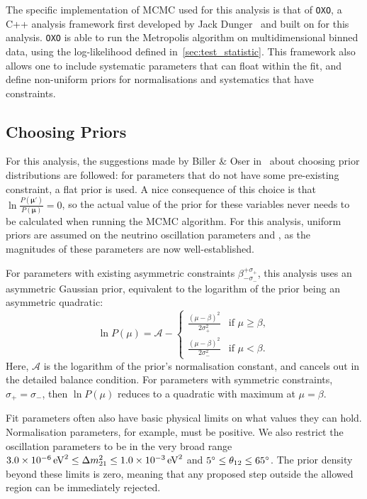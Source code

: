 The specific implementation of MCMC used for this analysis is that of \texttt{OXO}, a C++ analysis framework first developed by Jack Dunger~\cite{dungerTopologicalTimeBased2018} and built on for this analysis. %
\texttt{OXO} is able to run the Metropolis algorithm on multidimensional binned data, using the log-likelihood defined in~\ref{sec:test_statistic}. This framework also allows one to include systematic parameters that can float within the fit, and define non-uniform priors for normalisations and systematics that have constraints.

\subsection{Choosing Priors}
For this analysis, the suggestions made by Biller \& Oser in~\cite{billerAnotherLookConfidence2015} %
about choosing prior distributions are followed: for parameters that do not have some pre-existing constraint, a flat prior is used. A nice consequence of this choice is that $\ln{\frac{P\left(\bm{\mu}'\right)}{P\left(\bm{\mu}\right)}} = 0$, so the actual value of the prior for these variables never needs to be calculated when running the MCMC algorithm. For this analysis, uniform priors are assumed on the neutrino oscillation parameters \dmsq{} and \tonetwo{}, as the magnitudes of these parameters are now well-established.

For parameters with existing asymmetric constraints $\beta^{+\sigma_{+}}_{-\sigma_{-}}$, this analysis uses an asymmetric Gaussian prior, equivalent to the logarithm of the prior being an asymmetric quadratic:
\begin{equation}
    \ln{P\left(\mu\right)} = \mathcal{A} -
    \begin{cases}
        \frac{\left(\mu-\beta\right)^{2}}{2\sigma_{+}^{2}} & \textrm{if } \mu\geq\beta,\\
        \frac{\left(\mu-\beta\right)^{2}}{2\sigma_{-}^{2}} & \textrm{if } \mu<\beta.
    \end{cases}
\end{equation}
Here, $\mathcal{A}$ is the logarithm of the prior's normalisation constant, and cancels out in the detailed balance condition. For parameters with symmetric constraints, $\sigma_{+}=\sigma_{-}$, then $\ln{P\left(\mu\right)}$ reduces to a quadratic with maximum at $\mu = \beta$.

Fit parameters often also have basic physical limits on what values they can hold. Normalisation parameters, for example, must be positive. We also restrict the oscillation parameters to be in the very broad range $\SI{3.0e-6}{\eV\squared}\leq\dmsq{}\leq\SI{1.0e-3}{\eV\squared}$ and $\ang{5}\leq\theta_{12}{}\leq\ang{65}$. The prior density beyond these limits is zero, meaning that any proposed step outside the allowed region can be immediately rejected.

